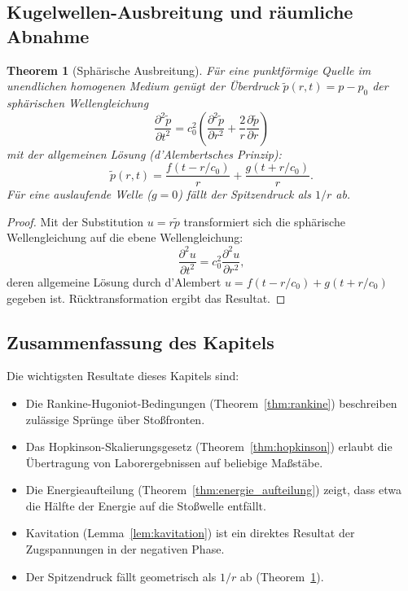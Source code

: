 ﻿\documentclass[12pt,a4paper]{article}
\newtheorem{theorem}{Theorem}[section]
\theoremstyle{definition}
\theoremstyle{remark}
\begin{document}
\subsection{Kugelwellen-Ausbreitung und räumliche Abnahme}

\begin{theorem}[Sphärische Ausbreitung]
\label{thm:sphärisch}
Für eine punktförmige Quelle im unendlichen homogenen Medium genügt der Überdruck $\tilde{p}(r,t) = p - p_0$ der sphärischen Wellengleichung
\begin{equation}
\frac{\partial^2 \tilde{p}}{\partial t^2} = c_0^2 \left(\frac{\partial^2 \tilde{p}}{\partial r^2} + \frac{2}{r}\frac{\partial \tilde{p}}{\partial r}\right)
\end{equation}
mit der allgemeinen Lösung (d'Alembertsches Prinzip):
\begin{equation}
\tilde{p}(r,t) = \frac{f(t - r/c_0)}{r} + \frac{g(t + r/c_0)}{r}.
\end{equation}
Für eine auslaufende Welle ($g = 0$) fällt der Spitzendruck als $1/r$ ab.
\end{theorem}
\begin{proof}
Mit der Substitution $u = r\tilde{p}$ transformiert sich die sphärische Wellengleichung auf die ebene Wellengleichung:
\[
\frac{\partial^2 u}{\partial t^2} = c_0^2 \frac{\partial^2 u}{\partial r^2},
\]
deren allgemeine Lösung durch d'Alembert $u = f(t-r/c_0) + g(t+r/c_0)$ gegeben ist. Rücktransformation ergibt das Resultat. 
\end{proof}

\subsection{Zusammenfassung des Kapitels}

Die wichtigsten Resultate dieses Kapitels sind:
\begin{itemize}
\item Die Rankine-Hugoniot-Bedingungen (Theorem~\ref{thm:rankine}) beschreiben zulässige Sprünge über Stoßfronten.
\item Das Hopkinson-Skalierungsgesetz (Theorem~\ref{thm:hopkinson}) erlaubt die Übertragung von Laborergebnissen auf beliebige Maßstäbe.
\item Die Energieaufteilung (Theorem~\ref{thm:energie_aufteilung}) zeigt, dass etwa die Hälfte der Energie auf die Stoßwelle entfällt.
\item Kavitation (Lemma~\ref{lem:kavitation}) ist ein direktes Resultat der Zugspannungen in der negativen Phase.
\item Der Spitzendruck fällt geometrisch als $1/r$ ab (Theorem~\ref{thm:sphärisch}).
\end{itemize}
\end{document}

